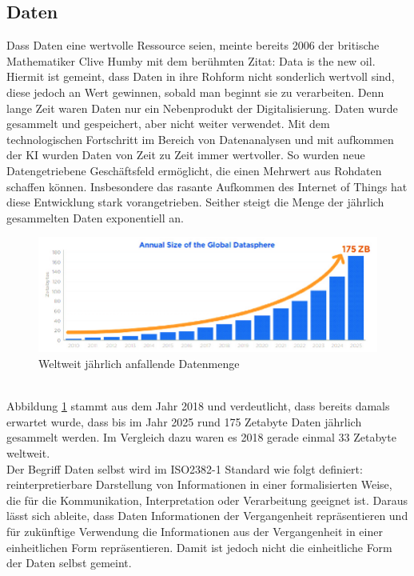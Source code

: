 \begin{onehalfspace}
    \subsection{Daten}
    \label{subsubsec:daten}
        Dass Daten eine wertvolle Ressource seien, meinte bereits 2006 der britische Mathematiker Clive Humby mit dem berühmten Zitat: \glqq{}Data is the new oil\grqq{}.\cite{Frorbes2021} Hiermit ist gemeint, dass Daten in ihre Rohform nicht sonderlich wertvoll sind, diese jedoch an Wert gewinnen, sobald man beginnt sie zu verarbeiten. Denn lange Zeit waren Daten nur ein Nebenprodukt der Digitalisierung. Daten wurde gesammelt und gespeichert, aber nicht weiter verwendet. Mit dem technologischen Fortschritt im Bereich von Datenanalysen und mit aufkommen der \ac{KI} wurden Daten von Zeit zu Zeit immer wertvoller. So wurden neue Datengetriebene Geschäftsfeld ermöglicht, die einen Mehrwert aus Rohdaten schaffen können. Insbesondere das rasante Aufkommen des Internet of Things hat diese Entwicklung stark vorangetrieben. Seither steigt die Menge der jährlich gesammelten Daten exponentiell an.\cite{Otto2019}
        \\
        \begin{figure}[h]
            \centering
            \includegraphics[width = 15.5cm]{Bilder/Annual_Data_Size.png}
            \caption{Weltweit jährlich anfallende Datenmenge \cite{Reinsel2018}}
            \label{fig:DataSize}
        \end{figure}
        \\
        Abbildung \ref{fig:DataSize} stammt aus dem Jahr 2018 und verdeutlicht, dass bereits damals erwartet wurde, dass bis im Jahr 2025 rund 175 Zetabyte Daten jährlich gesammelt werden. Im Vergleich dazu waren es 2018 gerade einmal 33 Zetabyte weltweit.\cite{Reinsel2018}\cite{Taleb2018}
        \\
        Der Begriff Daten selbst wird im ISO2382-1 Standard wie folgt definiert: \glqq{}reinterpretierbare Darstellung von Informationen in einer formalisierten Weise, die für die Kommunikation, Interpretation oder Verarbeitung geeignet ist\grqq{}.\cite{ISO2382} Daraus lässt sich ableite, dass Daten Informationen der Vergangenheit repräsentieren und für zukünftige Verwendung die Informationen aus der Vergangenheit in einer einheitlichen Form repräsentieren. Damit ist jedoch nicht die einheitliche Form der Daten selbst gemeint. 

\end{onehalfspace}
